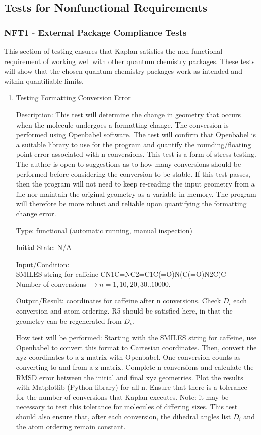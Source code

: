 \documentclass[12pt, titlepage]{article}
\newcommand{\progname}{Kaplan} %
\begin{document}
\subsection{Tests for Nonfunctional Requirements}

\subsubsection{NFT1 - External Package Compliance Tests}

This section of testing ensures that \progname{} satisfies the non-functional 
requirement of working well with other quantum chemistry packages. These tests 
will show that the chosen quantum chemistry packages work as intended and 
within quantifiable limits.

\begin{enumerate}
	
\item Testing Formatting Conversion Error

Description: This test will determine the change in geometry that occurs when 
the molecule undergoes a formatting change. The conversion is performed using 
Openbabel software. The test will confirm that Openbabel is a suitable library 
to use for the program and quantify the rounding/floating point error 
associated with n conversions. This test is a form of 
stress testing. The author is open to suggestions as to how many conversions 
should be performed before considering the conversion to be stable. If this 
test passes, then the program will not need to keep re-reading the input 
geometry from a file nor maintain the original geometry as a variable in 
memory. The program will therefore be more robust and reliable upon quantifying 
the formatting change error.

Type: functional (automatic running, manual inspection)

Initial State: N/A

Input/Condition: \\
SMILES string for caffeine CN1C=NC2=C1C(=O)N(C(=O)N2C)C \\
Number of conversions $\rightarrow n = {1, 10, 20, 30..10000}$.

Output/Result: coordinates for caffeine after n conversions. Check $D_i$ each 
conversion and atom ordering. R5 should be satisfied here, in that the geometry 
can be regenerated from $D_i$.

How test will be performed: Starting with the SMILES string for caffeine, use 
Openbabel to convert this format to Cartesian coordinates. Then, convert the 
xyz coordinates to a z-matrix with Openbabel. One conversion counts as 
converting to and from a z-matrix. Complete n conversions and calculate the 
RMSD error between the initial and final xyz geometries. Plot the results 
with Matplotlib (Python library) for all n. Ensure that there is a tolerance 
for the number of conversions that \progname{} executes. Note: it may be 
necessary to test this tolerance for molecules of differing sizes. This test 
should also ensure that, after each conversion, the dihedral angles list $D_i$ 
and the atom ordering remain constant.


\end{enumerate}
\end{document}
